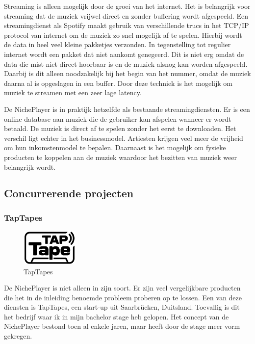 Streaming is alleen mogelijk door de groei van het internet. Het is belangrijk voor streaming dat de muziek vrijwel direct en zonder buffering wordt afgespeeld. Een streamingdienst als Spotify maakt gebruik van verschillende trucs in het TCP/IP protocol van internet om de muziek zo snel mogelijk af te spelen. Hierbij wordt de data in heel veel kleine pakketjes verzonden. In tegenstelling tot regulier internet wordt een pakket dat niet aankomt genegeerd. Dit is niet erg omdat de data die mist niet direct hoorbaar is en de muziek alsnog kan worden afgespeeld. Daarbij is dit alleen noodzakelijk bij het begin van het nummer, omdat de muziek daarna al is opgeslagen in een buffer. Door deze techniek is het mogelijk om muziek te streamen met een zeer lage latency.

De NichePlayer is in praktijk hetzelfde als bestaande streamingdiensten. Er is een online database aan muziek die de gebruiker kan afspelen wanneer er wordt betaald. De muziek is direct af te spelen zonder het eerst te downloaden. Het verschil ligt echter in het businessmodel. Artiesten krijgen veel meer de vrijheid om hun inkomstenmodel te bepalen. Daarnaast is het mogelijk om fysieke producten te koppelen aan de muziek waardoor het bezitten van muziek weer belangrijk wordt.

\subsection{Concurrerende projecten}
\subsubsection*{TapTapes}
\begin{figure}
    \centering
    \includegraphics[width=0.25\textwidth]{assets/critical-review/TapTapes.png}
    \caption{TapTapes}
    \label{fig:critical-review:TapTapes}
\end{figure}
De NichePlayer is niet alleen in zijn soort. Er zijn veel vergelijkbare producten die het in de inleiding benoemde probleem proberen op te lossen. Een van deze diensten is TapTapes, een start-up uit Saarbrücken, Duitsland. Toevallig is dit het bedrijf waar ik in mijn bachelor stage heb gelopen. Het concept van de NichePlayer bestond toen al enkele jaren, maar heeft door de stage meer vorm gekregen.


